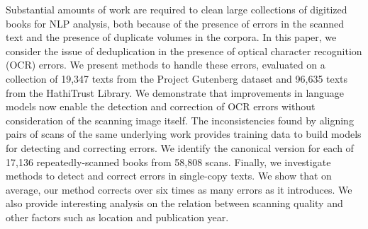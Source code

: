 Substantial amounts of work are required to clean large collections of digitized books for NLP analysis, both because of the presence of errors in the scanned text and the presence of duplicate volumes in the corpora. In this paper, we consider the issue of deduplication in the presence of optical character recognition (OCR) errors.  We present methods to handle these errors, evaluated on a collection of 19,347 texts from the Project Gutenberg dataset and 96,635 texts from the HathiTrust Library. We demonstrate that improvements in language models now enable the detection and correction of OCR errors without consideration of the scanning image itself. The inconsistencies found by aligning pairs of scans of the same underlying work provides training data to build models for detecting and correcting errors. We identify the canonical version for each of 17,136 repeatedly-scanned books from 58,808 scans.  Finally, we investigate methods to detect and correct errors in single-copy texts. We show that on average, our method corrects over six times as many errors as it introduces. We also provide interesting analysis on the relation between scanning quality and other factors such as location and publication year.
